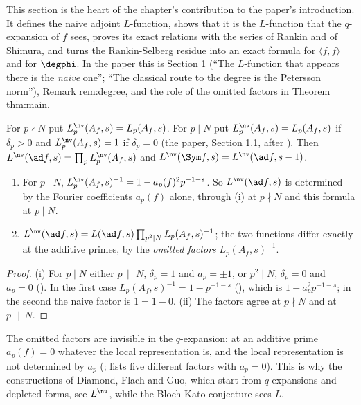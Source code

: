 This section is the heart of the chapter's contribution to the paper's introduction. It defines the naive adjoint $L$-function, shows that it is the
$L$-function that the $q$-expansion of $f$ sees, proves its exact relations with the series of Rankin and of Shimura, and turns the Rankin-Selberg
residue into an exact formula for $\langle f,f\rangle$ and for $\degphi$. In the paper this is Section 1 (``The $L$-function that appears there is the \emph{naive}
one''; ``The classical route to the degree is the Petersson norm''), Remark rem:degree, and the role of the omitted factors in Theorem thm:main.

\begin{definition}\label{def:lfunctions:naive}
For $p\nmid N$ put $L_p^{\nv}(A_f,s)=L_p(A_f,s)$. For $p\mid N$ put $L_p^{\nv}(A_f,s)=L_p(A_f,s)$ if $\delta_p>0$ and $L_p^{\nv}(A_f,s)=1$ if $\delta_p=0$ (the paper, Section 1.1, after
\cite[\S1.7.2]{DFG04}). Then $L^{\nv}(\ad f,s)=\prod_pL_p^{\nv}(A_f,s)$ and $L^{\nv}(\Sym f,s)=L^{\nv}(\ad f,s-1)$.
\end{definition}

\begin{proposition}\label{prop:lfunctions:naive}
\begin{enumerate}[label=(\roman*)]
\item For $p\mid N$, $L_p^{\nv}(A_f,s)^{-1}=1-a_p(f)^2p^{-1-s}$. So $L^{\nv}(\ad f,s)$ is determined by the Fourier coefficients $a_p(f)$ alone, through
(i) at $p\nmid N$ and this formula at $p\mid N$.
\item $L^{\nv}(\ad f,s)=L(\ad f,s)\prod_{p^2\mid N}L_p(A_f,s)^{-1}$; the two functions differ exactly at the additive primes, by the \emph{omitted factors} $L_p(A_f,s)^{-1}$.
\end{enumerate}
\end{proposition}

\begin{proof}
(i) For $p\mid N$ either $p\,\|\,N$, $\delta_p=1$ and $a_p=\pm1$, or $p^2\mid N$, $\delta_p=0$ and $a_p=0$ (). In the first case $L_p(A_f,s)^{-1}=1-p^{-1-s}$
(), which is $1-a_p^2p^{-1-s}$; in the second the naive factor is $1=1-0$. (ii) The factors agree at $p\nmid N$ and at $p\,\|\,N$.
\end{proof}

The omitted factors are invisible in the $q$-expansion: at an additive prime $a_p(f)=0$ whatever the local representation is, and the local representation is
not determined by $a_p$ (;  lists five different factors with $a_p=0$). This is why the constructions of Diamond, Flach and
Guo, which start from $q$-expansions and depleted forms, see $L^{\nv}$, while the Bloch-Kato conjecture sees $L$.

